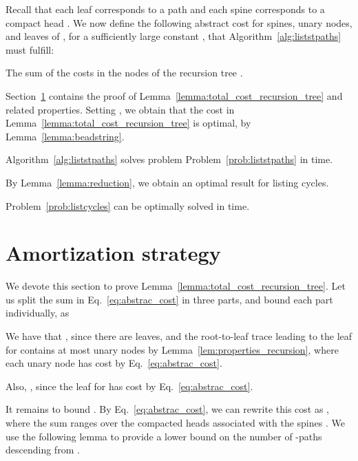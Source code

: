Recall that each leaf corresponds to a path  and each spine
corresponds to a
compact head . We now define the following abstract
cost for spines, unary nodes, and leaves of , for a sufficiently
large constant , that Algorithm~\ref{alg:liststpaths} must
fulfill:


\begin{lemma}
  \label{lemma:total_cost_recursion_tree}
  The sum of the costs in the nodes of the recursion tree .
\end{lemma}

Section~\ref{sec:recursion-amortization} contains the proof of
Lemma~\ref{lemma:total_cost_recursion_tree} and related properties.
Setting , we obtain that the cost in
Lemma~\ref{lemma:total_cost_recursion_tree} is optimal, by
Lemma~\ref{lemma:beadstring}.

\begin{theorem}
  \label{theorem:optimal_paths}
  Algorithm~\ref{alg:liststpaths} solves problem
  Problem~\ref{prob:liststpaths} in  time.
\end{theorem}

By Lemma~\ref{lemma:reduction}, we obtain an optimal result for
listing cycles.

\begin{theorem}
  \label{theorem:optimal_cycles}
  Problem~\ref{prob:listcycles} can be optimally solved in \mbox{} time. 
\end{theorem}

\section{Amortization strategy}
\label{sec:recursion-amortization}


We devote this section to prove
Lemma~\ref{lemma:total_cost_recursion_tree}. Let us split the sum
in Eq.~\eqref{eq:abstrac_cost} in three parts, and bound each part
individually, as


We have that , since there are
 leaves, and the root-to-leaf trace leading to
the leaf for  contains at most  unary nodes by
Lemma~\ref{lem:properties_recursion}, where each unary node has cost
 by Eq.~\eqref{eq:abstrac_cost}.

Also, , since the leaf  for  has cost
 by Eq.~\eqref{eq:abstrac_cost}.

It remains to bound . By
Eq.~\eqref{eq:abstrac_cost}, we can rewrite this cost as
, where the sum ranges over the
compacted heads  associated with the spines . We use the
following lemma to provide a lower bound on the number of -paths
descending from .

